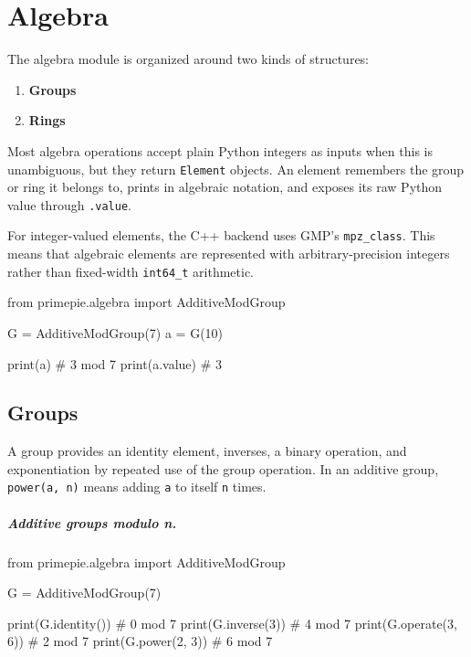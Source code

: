 \chapter{Algebra}

The algebra module is organized around two kinds of structures:
\begin{enumerate}
  \item \textbf{Groups}
  \item \textbf{Rings}
\end{enumerate}

Most algebra operations accept plain Python integers as inputs when this is
unambiguous, but they return \texttt{Element} objects. An element remembers the
group or ring it belongs to, prints in algebraic notation, and exposes its raw
Python value through \texttt{.value}.

For integer-valued elements, the C++ backend uses GMP's
\texttt{mpz\_class}. This means that algebraic elements are represented with
arbitrary-precision integers rather than fixed-width \texttt{int64\_t}
arithmetic.

\begin{pybox}
from primepie.algebra import AdditiveModGroup

G = AdditiveModGroup(7)
a = G(10)

print(a)        # 3 mod 7
print(a.value)  # 3
\end{pybox}

\section{Groups}

A group provides an identity element, inverses, a binary operation, and
exponentiation by repeated use of the group operation. In an additive group,
\texttt{power(a, n)} means adding \texttt{a} to itself \texttt{n} times.

\paragraph{Additive groups modulo n.}
\begin{pybox}
from primepie.algebra import AdditiveModGroup

G = AdditiveModGroup(7)

print(G.identity())       # 0 mod 7
print(G.inverse(3))       # 4 mod 7
print(G.operate(3, 6))    # 2 mod 7
print(G.power(2, 3))      # 6 mod 7
\end{pybox}

